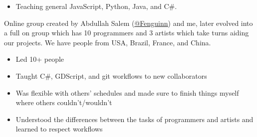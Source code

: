 \documentclass[10pt,a4paper,ragged2e,withhyper]{altacv}
\begin{document}
\begin{paracol}{2}
	
	
	\divider
	
	
	
	\begin{itemize}
		\item Teaching general JavaScript, Python, Java, and C\#.
	\end{itemize}
	
	\divider
	
	
	Online group created by Abdullah Salem (\href{https://github.com/Fenguinn}{\uline{@Fenguinn}}) and me, later evolved into a full on group which has 10 programmers and 3 artists which take turns aiding our projects. We have people from USA, Brazil, France, and China.
	
	\medskip
	
	\begin{itemize}
		\item Led 10+ people
		\item Taught C\#, GDScript, and git workflows to new collaborators
		\item Was flexible with others’ schedules and made sure to finish things myself where others couldn’t/wouldn’t
		\item Understood the differences between the tasks of programmers and artists and learned to respect workflows
	\end{itemize}
	
	\divider
	
	
	
	

\end{paracol}
\end{document}
